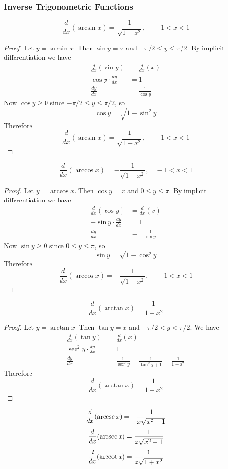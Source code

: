 \subsubsection*{Inverse Trigonometric Functions}
\[\frac{d}{dx}(\arcsin x)=\frac{1}{\sqrt{1-x^2}},\quad -1<x<1\]
\begin{proof}
    Let \(y=\arcsin x \).
    Then \(\sin y=x\) and \(-\pi/2\leq y\leq\pi/2\).
    By implicit differentiation we have
    \begin{align*}
        \frac{d}{dx}(\sin y) &= \frac{d}{dx}(x) \\
        \cos y\cdot\frac{dy}{dx} &= 1 \\
        \frac{dy}{dx} &= \frac{1}{\cos y}
    \end{align*}
    Now \(\cos y\geq0\) since \(-\pi/2\leq y\leq\pi/2\), so
    \[\cos y=\sqrt{1-\sin^2 y}\]
    Therefore
\[\frac{d}{dx}(\arcsin x)=\frac{1}{\sqrt{1-x^2}},\quad -1<x<1\]
\end{proof}
\[\frac{d}{dx}(\arccos x)=-\frac{1}{\sqrt{1-x^2}},\quad -1<x<1\]
\begin{proof}
    Let \(y=\arccos x\).
    Then \(\cos y=x\) and \(0\leq y\leq\pi\).
    By implicit differentiation we have
    \begin{align*}
        \frac{d}{dx}(\cos y) &= \frac{d}{dx}(x) \\
        -\sin y\cdot\frac{dy}{dx} &= 1 \\
        \frac{dy}{dx} &= -\frac{1}{\sin y}
    \end{align*}
    Now \(\sin y\geq0\) since \(0\leq y\leq\pi\), so
    \[\sin y=\sqrt{1-\cos^2 y}\]
    Therefore
    \[\frac{d}{dx}(\arccos x)=-\frac{1}{\sqrt{1-x^2}},\quad -1<x<1\]
\end{proof}
\[\frac{d}{dx}(\arctan x)=\frac{1}{1+x^2}\]
\begin{proof}
    Let \(y=\arctan x\).
    Then \(\tan y=x\) and \(-\pi/2<y<\pi/2\).
    We have
    \begin{align*}
        \frac{d}{dx}(\tan y) &= \frac{d}{dx}(x) \\
        \sec^2 y\cdot\frac{dy}{dx} &= 1 \\
        \frac{dy}{dx} &= \frac{1}{\sec^2 y}=\frac{1}{\tan^2 y+1}
        =\frac{1}{1+x^2}
    \end{align*}
    Therefore
    \[\frac{d}{dx}(\arctan x)=\frac{1}{1+x^2} \]
\end{proof}
\[\frac{d}{dx}(\operatorname{arccsc} x)=-\frac{1}{x\sqrt{x^2-1}}\]
\[\frac{d}{dx}(\operatorname{arcsec} x)=\frac{1}{x\sqrt{x^2-1}}\]
\[\frac{d}{dx}(\operatorname{arccot} x)=\frac{1}{x\sqrt{1+x^2}}\]